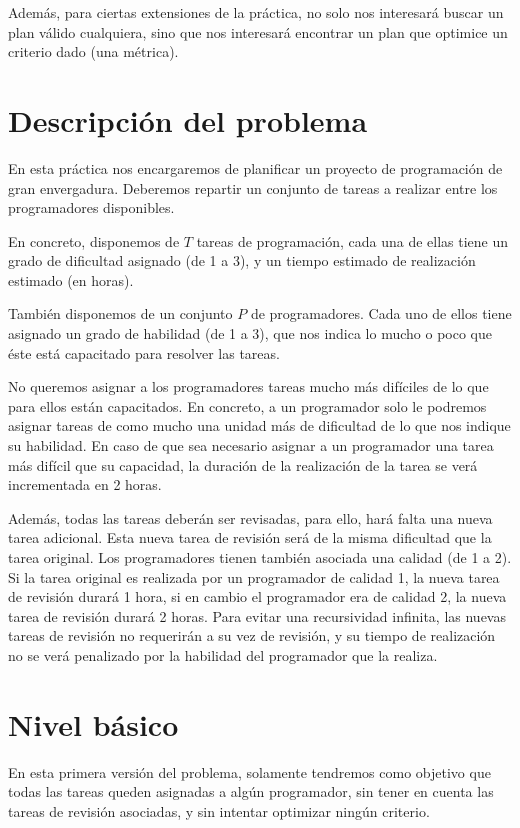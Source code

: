 \documentclass[11pt]{article}
\begin{document}
Además, para ciertas extensiones de la práctica, no solo nos interesará buscar un plan válido cualquiera, sino que nos interesará encontrar un plan que optimice un criterio dado (una métrica).

\section{Descripción del problema}
En esta práctica nos encargaremos de planificar un proyecto de programación de gran envergadura.
Deberemos repartir un conjunto de tareas a realizar entre los programadores disponibles.

En concreto, disponemos de $T$ tareas de programación, cada una de ellas tiene un grado de dificultad asignado (de 1 a 3), y un tiempo estimado de realización estimado (en horas).

También disponemos de un conjunto $P$ de programadores. Cada uno de ellos tiene asignado un grado de habilidad (de 1 a 3), que nos indica lo mucho o poco que éste está capacitado para resolver las tareas.

No queremos asignar a los programadores tareas mucho más difíciles de lo que para ellos están capacitados. En concreto, a un programador solo le podremos asignar tareas de como mucho una unidad más de dificultad de lo que nos indique su habilidad. En caso de que sea necesario asignar a un programador una tarea más difícil que su capacidad, la duración de la realización de la tarea se verá incrementada en 2 horas.

Además, todas las tareas deberán ser revisadas, para ello, hará falta una nueva tarea adicional. Esta nueva tarea de revisión será de la misma dificultad que la tarea original.
Los programadores tienen también asociada una calidad (de 1 a 2). Si la tarea original es realizada por un programador de calidad 1, la nueva tarea de revisión durará 1 hora, si en cambio el programador era de calidad 2, la nueva tarea de revisión durará 2 horas. 
Para evitar una recursividad infinita, las nuevas tareas de revisión no requerirán a su vez de revisión, y su tiempo de realización no se verá penalizado por la habilidad del programador que la realiza.


\section{Nivel básico} \label{basic}
En esta primera versión del problema, solamente tendremos como objetivo que todas las tareas queden asignadas a algún programador, sin tener en cuenta las tareas de revisión asociadas, y sin intentar optimizar ningún criterio.
\end{document}
